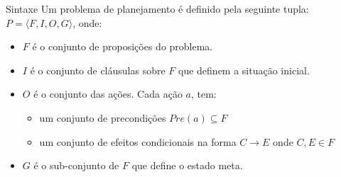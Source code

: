\begin{frame}{Sintaxe}
Um problema de planejamento é definido pela seguinte tupla: $P=\langle F, I, O, G\rangle$, 
onde:
\begin{itemize}
 \item $F$ é o conjunto de proposições do problema.
 \item $I$ é o conjunto de cláusulas sobre $F$ que definem a situação inicial.
 \item $O$ é o conjunto das ações. Cada ação $a$, tem:
    \begin{itemize}
       \item um conjunto de precondições $Pre(a) \subseteq F$
       \item um conjunto de efeitos condicionais na forma $C\rightarrow E$ onde $C,E \in F$
    \end{itemize}
 \item $G$ é o sub-conjunto de $F$ que define o estado meta. 
\end{itemize}

\end{frame}


% 



